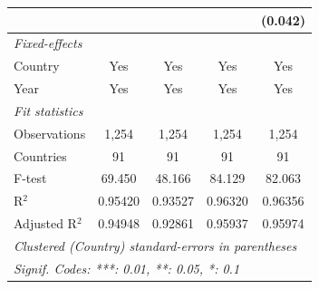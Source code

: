 \begin{table}[H]
\begin{tabular}{lcccc}
                                                                     &               &              &               & (0.042)\\   
      \midrule
      \emph{Fixed-effects}\\
      Country                                                        & Yes           & Yes          & Yes           & Yes\\  
      Year                                                           & Yes           & Yes          & Yes           & Yes\\  
      \midrule
      \emph{Fit statistics}\\
      Observations                                                   & 1,254         & 1,254        & 1,254         & 1,254\\  
      Countries                                                      & 91            & 91           & 91            & 91\\  
      F-test                                                         & 69.450        & 48.166       & 84.129        & 82.063\\  
      R$^2$                                                          & 0.95420       & 0.93527      & 0.96320       & 0.96356\\  
      Adjusted R$^2$                                                 & 0.94948       & 0.92861      & 0.95937       & 0.95974\\  
      \midrule \midrule
      \multicolumn{5}{l}{\emph{Clustered (Country) standard-errors in parentheses}}\\
      \multicolumn{5}{l}{\emph{Signif. Codes: ***: 0.01, **: 0.05, *: 0.1}}\\
   \end{tabular}
\end{table}


